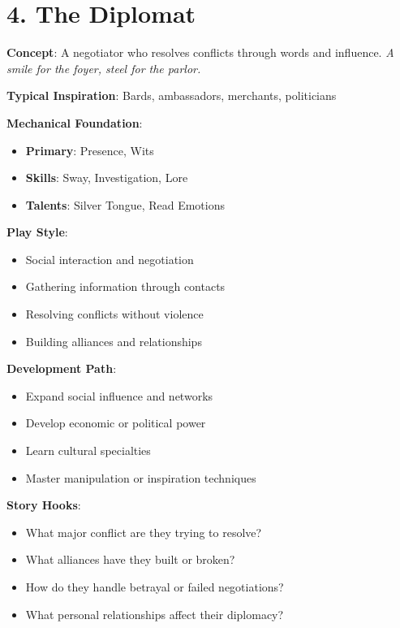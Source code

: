 \section{4. The Diplomat}

\textbf{Concept}: A negotiator who resolves conflicts through words and influence. \emph{A smile for the foyer, steel for the parlor.}

\textbf{Typical Inspiration}: Bards, ambassadors, merchants, politicians

\textbf{Mechanical Foundation}:
\begin{itemize}
\item \textbf{Primary}: Presence, Wits
\item \textbf{Skills}: Sway, Investigation, Lore
\item \textbf{Talents}: Silver Tongue, Read Emotions
\end{itemize}

\textbf{Play Style}:
\begin{itemize}
\item Social interaction and negotiation
\item Gathering information through contacts
\item Resolving conflicts without violence
\item Building alliances and relationships
\end{itemize}

\textbf{Development Path}:
\begin{itemize}
\item Expand social influence and networks
\item Develop economic or political power
\item Learn cultural specialties
\item Master manipulation or inspiration techniques
\end{itemize}

\textbf{Story Hooks}:
\begin{itemize}
\item What major conflict are they trying to resolve?
\item What alliances have they built or broken?
\item How do they handle betrayal or failed negotiations?
\item What personal relationships affect their diplomacy?
\end{itemize}

